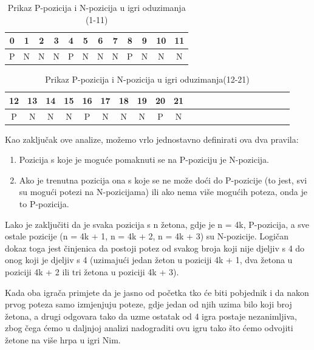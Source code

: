\begin{table}[H]
\caption{Prikaz P-pozicija i N-pozicija u igri oduzimanja (1-11)}
\label{tbl:igra21_1-11}
\centering
\begin{tabular}{|c|c|c|c|c|c|c|c|c|c|c|c|}
\hline
0 & 1 & 2 & 3 & 4 & 5 & 6 & 7 & 8 & 9 & 10 & 11 \\
\hline
P & N & N & N & P & N & N & N & P & N & N & N \\
\hline
\end{tabular}
\end{table}


\begin{table}[H]
\caption{Prikaz P-pozicija i N-pozicija u igri oduzimanja(12-21)}
\label{tbl:igra21_12-21}
\centering
\begin{tabular}{|c|c|c|c|c|c|c|c|c|c|c|c|c|c|c|c|c|c|c|c|c|c|}
\hline
12 & 13 & 14 & 15 & 16 & 17 & 18 & 19 & 20 & 21 \\
\hline
P & N & N & N & P & N & N & N & P & N \\
\hline
\end{tabular}
\end{table}

Kao zaključak ove analize, možemo vrlo jednostavno definirati ova dva pravila:

\begin{enumerate}
\item Pozicija s koje je moguće pomaknuti se na P-poziciju je N-pozicija.
\item Ako je trenutna pozicija ona s koje se ne može doći do P-pozicije (to jest, svi su mogući potezi na N-pozicijama) ili ako nema više mogućih poteza, onda je to P-pozicija. 
\end{enumerate}

Lako je zaključiti da je svaka pozicija s n žetona, gdje je n = 4k, P-pozicija, a sve ostale pozicije (n = 4k + 1, n = 4k + 2, n = 4k + 3) su N-pozicije. Logičan dokaz toga jest činjenica da postoji potez od svakog broja koji nije djeljiv s 4 do onog koji je djeljiv s 4 (uzimajući jedan žeton u poziciji 4k + 1, dva žetona u poziciji 4k + 2 ili tri žetona u poziciji 4k + 3). 

Kada oba igrača primjete da je jasno od početka tko će biti pobjednik i da nakon prvog poteza samo izmjenjuju poteze, gdje jedan od njih uzima bilo koji broj žetona, a drugi odgovara tako da uzme ostatak od 4 igra postaje nezanimljiva, zbog čega ćemo u daljnjoj analizi nadograditi ovu igru tako što ćemo odvojiti žetone na više hrpa u igri Nim.

